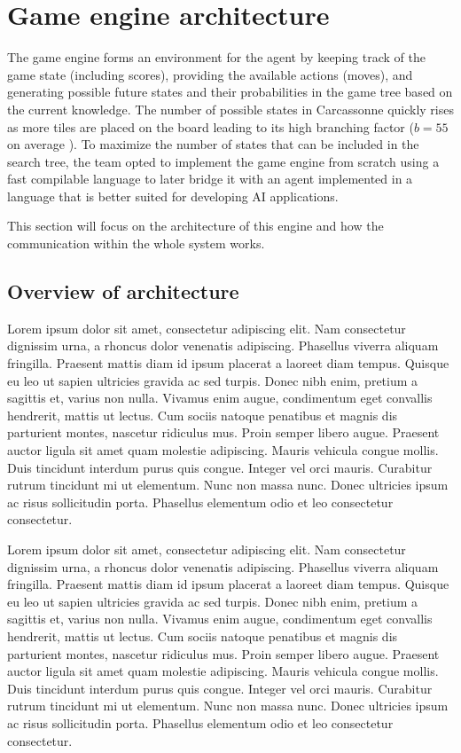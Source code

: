 \section{Game engine architecture}
The game engine forms an environment for the agent by keeping track of the game state (including scores), providing the available actions (moves), and generating possible future states and their probabilities in the game tree based on the current knowledge.
The number of possible states in Carcassonne quickly rises as more tiles are placed on the board leading to its high branching factor ($b = 55$ on average \cite{MasterThesisCarcassonne}).
To maximize the number of states that can be included in the search tree, the team opted to implement the game engine from scratch using a fast compilable language to later bridge it with an agent implemented in a language that is better suited for developing AI applications.

This section will focus on the architecture of this engine and how the communication within the whole system works.

\subsection{Overview of architecture}
Lorem ipsum dolor sit amet, consectetur adipiscing elit. Nam consectetur dignissim urna, a rhoncus dolor venenatis adipiscing. Phasellus viverra aliquam fringilla. Praesent mattis diam id ipsum placerat a laoreet diam tempus. Quisque eu leo ut sapien ultricies gravida ac sed turpis. Donec nibh enim, pretium a sagittis et, varius non nulla. Vivamus enim augue, condimentum eget convallis hendrerit, mattis ut lectus. Cum sociis natoque penatibus et magnis dis parturient montes, nascetur ridiculus mus. Proin semper libero augue. Praesent auctor ligula sit amet quam molestie adipiscing. Mauris vehicula congue mollis. Duis tincidunt interdum purus quis congue. Integer vel orci mauris. Curabitur rutrum tincidunt mi ut elementum. Nunc non massa nunc. Donec ultricies ipsum ac risus sollicitudin porta. Phasellus elementum odio et leo consectetur consectetur. 

Lorem ipsum dolor sit amet, consectetur adipiscing elit. Nam consectetur dignissim urna, a rhoncus dolor venenatis adipiscing. Phasellus viverra aliquam fringilla. Praesent mattis diam id ipsum placerat a laoreet diam tempus. Quisque eu leo ut sapien ultricies gravida ac sed turpis. Donec nibh enim, pretium a sagittis et, varius non nulla. Vivamus enim augue, condimentum eget convallis hendrerit, mattis ut lectus. Cum sociis natoque penatibus et magnis dis parturient montes, nascetur ridiculus mus. Proin semper libero augue. Praesent auctor ligula sit amet quam molestie adipiscing. Mauris vehicula congue mollis. Duis tincidunt interdum purus quis congue. Integer vel orci mauris. Curabitur rutrum tincidunt mi ut elementum. Nunc non massa nunc. Donec ultricies ipsum ac risus sollicitudin porta. Phasellus elementum odio et leo consectetur consectetur. 

